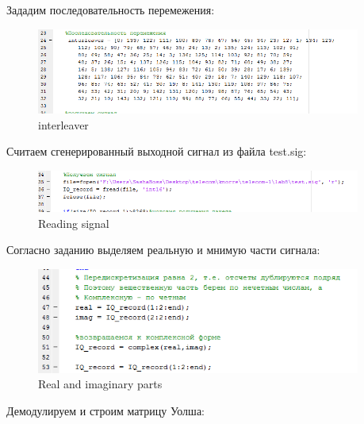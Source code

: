 \documentclass[a4paper,14pt]{extarticle}
\begin{document}
Зададим последовательность перемежения:

\begin{figure}[H]
\centering
\includegraphics[width=0.95\textwidth]{interleaver}
\captionsetup{justification=centering,margin=1.0 cm}
\caption{interleaver}
\label{any}
\end{figure}

Считаем сгенерированный выходной сигнал из файла test.sig:

\begin{figure}[H]
\centering
\includegraphics[width=0.95\textwidth]{read}
\captionsetup{justification=centering,margin=1.0 cm}
\caption{Reading signal}
\label{any}
\end{figure}

Согласно заданию выделяем реальную и мнимую части сигнала:

\begin{figure}[H]
\centering
\includegraphics[width=0.95\textwidth]{reim}
\captionsetup{justification=centering,margin=1.0cm}
\caption{Real and imaginary parts}
\label{sig}
\end{figure}

Демодулируем и строим матрицу Уолша:
\end{document}
